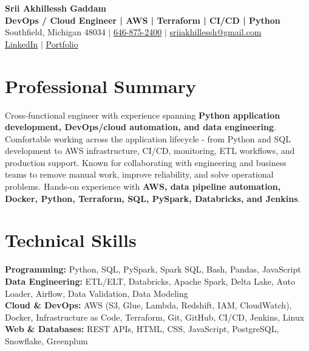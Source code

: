 \documentclass[letterpaper,10pt]{article}
\begin{document}
\fontsize{9.35pt}{10.45pt}\selectfont

\begin{center}
    {\LARGE \textbf{Srii Akhillessh Gaddam}} \\[-1pt]
    \textbf{DevOps / Cloud Engineer | AWS | Terraform | CI/CD | Python} \\[2pt]
    Southfield, Michigan 48034 $|$
    \href{tel:6468752400}{646-875-2400} $|$
    \href{mailto:sriiakhillessh@gmail.com}{sriiakhillessh@gmail.com} \\[1pt]
    \href{https://www.linkedin.com/in/srii-akhiilessh-gaddam-b48668191/}{LinkedIn} $|$
    \href{https://sriiakhillesshg.github.io/portfolio/}{Portfolio}
\end{center}
\vspace{-8pt}

\section{Professional Summary}
\small{Cross-functional engineer with experience spanning \textbf{Python application development, DevOps/cloud automation, and data engineering}. Comfortable working across the application lifecycle - from Python and SQL development to AWS infrastructure, CI/CD, monitoring, ETL workflows, and production support. Known for collaborating with engineering and business teams to remove manual work, improve reliability, and solve operational problems. Hands-on experience with \textbf{AWS, data pipeline automation, Docker, Python, Terraform, SQL, PySpark, Databricks, and Jenkins}.}

\section{Technical Skills}
\small{
\textbf{Programming:} Python, SQL, PySpark, Spark SQL, Bash, Pandas, JavaScript \\
\textbf{Data Engineering:} ETL/ELT, Databricks, Apache Spark, Delta Lake, Auto Loader, Airflow, Data Validation, Data Modeling \\
\textbf{Cloud \& DevOps:} AWS (S3, Glue, Lambda, Redshift, IAM, CloudWatch), Docker, Infrastructure as Code, Terraform, Git, GitHub, CI/CD, Jenkins, Linux \\
\textbf{Web \& Databases:} REST APIs, HTML, CSS, JavaScript, PostgreSQL, Snowflake, Greenplum
}
\end{document}
